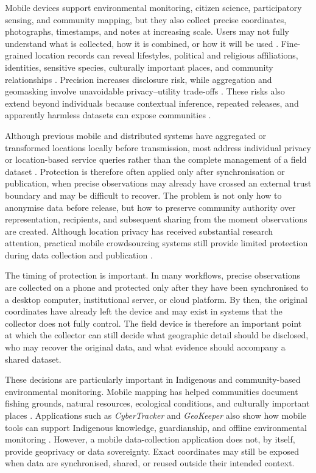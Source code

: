 \documentclass[]{interact}
\begin{document}
Mobile devices support environmental monitoring, citizen science, participatory sensing, and community mapping, but they also collect precise coordinates, photographs, timestamps, and notes at increasing scale. Users may not fully understand what is collected, how it is combined, or how it will be used \citep{mckenzie2019geospatial}. Fine-grained location records can reveal lifestyles, political and religious affiliations, identities, sensitive species, culturally important places, and community relationships \citep{christin2011survey,christin2016privacy,pyrgelis2016privacy}. Precision increases disclosure risk, while aggregation and geomasking involve unavoidable privacy--utility trade-offs \citep{kim2022privacy,kessler2018geoprivacy}. These risks also extend beyond individuals because contextual inference, repeated releases, and apparently harmless datasets can expose communities \citep{masinde2023group}. 

Although previous mobile and distributed systems have aggregated or transformed locations locally before transmission, most address individual privacy or location-based service queries rather than the complete management of a field dataset \citep{pyrgelis2016privacy,meftah2021empowering,ye2019toward,chow2006peer}. Protection is therefore often applied only after synchronisation or publication, when precise observations may already have crossed an external trust boundary and may be difficult to recover. The problem is not only how to anonymise data before release, but how to preserve community authority over representation, recipients, and subsequent sharing from the moment observations are created. Although location privacy has received substantial research attention, practical mobile crowdsourcing systems still provide limited protection during data collection and publication \citep{boukoros2019lack,kim2022privacy}.

The timing of protection is important. In many workflows, precise observations are collected on a phone and protected only after they have been synchronised to a desktop computer, institutional server, or cloud platform. By then, the original coordinates have already left the device and may exist in systems that the collector does not fully control. The field device is therefore an important point at which the collector can still decide what geographic detail should be disclosed, who may recover the original data, and what evidence should accompany a shared dataset. 

These decisions are particularly important in Indigenous and community-based environmental monitoring. Mobile mapping has helped communities document fishing grounds, natural resources, ecological conditions, and culturally important places \citep{paul2016piloting}. Applications such as \textit{CyberTracker} and \textit{GeoKeeper} also show how mobile tools can support Indigenous knowledge, guardianship, and offline environmental monitoring \citep{ens2012cybertracker,kwusen2024geokeeper}. However, a mobile data-collection application does not, by itself, provide geoprivacy or data sovereignty. Exact coordinates may still be exposed when data are synchronised, shared, or reused outside their intended context.
\end{document}
